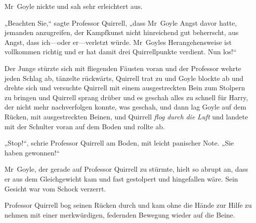 Mr~Goyle nickte und sah sehr erleichtert aus.

„Beachten Sie,“ sagte Professor Quirrell, „dass Mr~Goyle Angst davor hatte, jemanden anzugreifen, der Kampfkunst nicht hinreichend gut beherrscht, aus Angst, dass ich—oder er—verletzt würde. Mr~Goyles Herangehensweise ist vollkommen richtig und er hat damit drei Quirrellpunkte verdient. Nun los!“

Der Junge stürzte sich mit fliegenden Fäusten voran und der Professor wehrte jeden Schlag ab, tänzelte rückwärts, Quirrell trat zu und Goyle blockte ab und drehte sich und versuchte Quirrell mit einem ausgestreckten Bein zum Stolpern zu bringen und Quirrell sprang drüber und es geschah alles zu schnell für Harry, der nicht mehr nachverfolgen konnte, was geschah, und dann lag Goyle auf dem Rücken, mit ausgestreckten Beinen, und Quirrell \emph{flog durch die Luft} und landete mit der Schulter voran auf dem Boden und rollte ab.

„Stop!“, schrie Professor Quirrell am Boden, mit leicht panischer Note. „Sie haben gewonnen!“

Mr~Goyle, der gerade auf Professor Quirrell zu stürmte, hielt so abrupt an, dass er aus dem Gleichgewicht kam und fast gestolpert und hingefallen wäre. Sein Gesicht war vom Schock verzerrt.

Professor Quirrell bog seinen Rücken durch und kam ohne die Hände zur Hilfe zu nehmen mit einer merkwürdigen, federnden Bewegung wieder auf die Beine.

